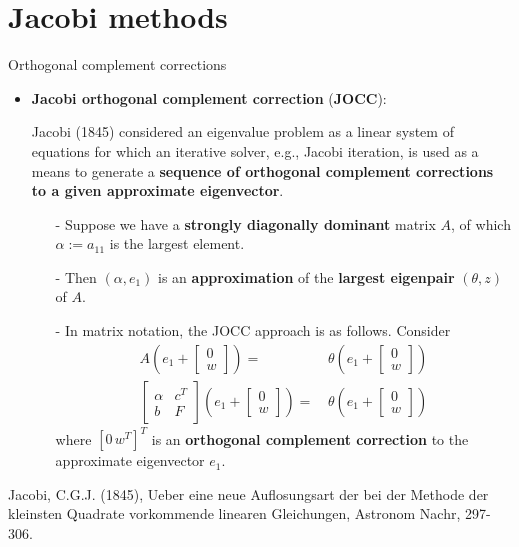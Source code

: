 \documentclass[t,usepdftitle=false]{beamer}
\begin{document}
\section{Jacobi methods}
\begin{frame}{Orthogonal complement corrections}
\begin{itemize}
\item \textbf{Jacobi orthogonal complement correction} (\textbf{JOCC}):
\item[] Jacobi (1845) considered an eigenvalue problem as a linear system of equations for which an iterative solver, e.g., Jacobi iteration, is used as a means to generate a \textbf{sequence of orthogonal complement corrections to a given approximate eigenvector}.
\begin{itemize}\normalsize
\item[-] Suppose we have a \textbf{strongly diagonally dominant} matrix $A$, of which $\alpha:=a_{11}$ is the largest element.
\item[-] Then $(\alpha,e_1)$ is an \textbf{approximation} of the \textbf{largest eigenpair} $(\theta,z)$ of $A$.
\item[-] In matrix notation, the JOCC approach is as follows. Consider
\begin{align*}
A
\left(
e_1+\begin{bmatrix}0\\w\end{bmatrix}
\right)
=&\,
\theta
\left(
e_1+\begin{bmatrix}0\\w\end{bmatrix}
\right)\\
\begin{bmatrix}\alpha&c^T\\b&F\end{bmatrix}
\left(
e_1+\begin{bmatrix}0\\w\end{bmatrix}
\right)
=&\,
\theta
\left(
e_1+\begin{bmatrix}0\\w\end{bmatrix}
\right)
\end{align*}
where $[0\,w^T]^T$ is an \textbf{orthogonal complement correction} to the approximate eigenvector $e_1$.
\end{itemize}
\end{itemize}\smallskip
\tiny{Jacobi, C.G.J. (1845), Ueber eine neue Auflosungsart der bei der Methode der kleinsten Quadrate vorkommende linearen Gleichungen, Astronom Nachr, 297-306.}
\end{frame}
\end{document}
